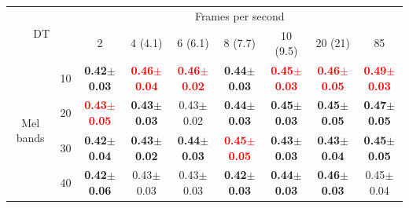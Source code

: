 \documentclass[final,3p,times,twocolumn]{elsarticle}
\begin{document}
\begin{table}[h]
\begin{tabular}{ll|c|c|c|c|c|c|c|}
\cline{3-9}
\multicolumn{2}{c}{\multirow{2}{*}{DT}} & \multicolumn{7}{|c|}{Frames per second}\\ \cline{3-9}
 & & 2 & 4 (4.1) & 6 (6.1) & 8 (7.7) & 10 (9.5) & 20 (21) & 85 \\ \cline{1-9}
\multicolumn{1}{|c}{\multirow{4}{*}{Mel bands}}
 & \multicolumn{1}{|c|}{10} & \textbf{0.42$\pm$0.03} & \textbf{\textcolor{red}{0.46$\pm$0.04}} & \textbf{\textcolor{red}{0.46$\pm$0.02}} & \textbf{0.44$\pm$0.03} & \textbf{\textcolor{red}{0.45$\pm$0.03}} & \textbf{\textcolor{red}{0.46$\pm$0.05}} & \textbf{\textcolor{red}{0.49$\pm$0.03}} \\ \cline{2-9}
\multicolumn{1}{|c}{}
 & \multicolumn{1}{|c|}{20} & \textbf{\textcolor{red}{0.43$\pm$0.05}} & \textbf{0.43$\pm$0.03} & 0.43$\pm$0.02 & \textbf{0.44$\pm$0.03} & \textbf{0.45$\pm$0.03} & \textbf{0.45$\pm$0.05} & \textbf{0.47$\pm$0.05} \\ \cline{2-9}
\multicolumn{1}{|c}{}
 & \multicolumn{1}{|c|}{30} & \textbf{0.42$\pm$0.04} & \textbf{0.43$\pm$0.02} & \textbf{0.44$\pm$0.03} & \textbf{\textcolor{red}{0.45$\pm$0.05}} & \textbf{0.43$\pm$0.03} & \textbf{0.43$\pm$0.04} & \textbf{0.45$\pm$0.05} \\ \cline{2-9}
\multicolumn{1}{|c}{}
 & \multicolumn{1}{|c|}{40} & \textbf{0.42$\pm$0.06} & 0.43$\pm$0.03 & 0.43$\pm$0.03 & \textbf{0.42$\pm$0.03} & \textbf{0.44$\pm$0.03} & \textbf{0.46$\pm$0.03} & 0.45$\pm$0.04 \\ \cline{1-9}
\end{tabular}


\end{table}
\end{document}
